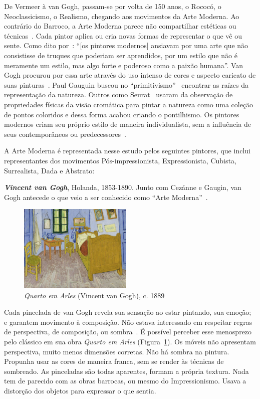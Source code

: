 De Vermeer à van Gogh, passam-se por volta de 150 anos, o Rococó, o
Neoclassicismo, o Realismo, chegando aos movimentos da Arte
Moderna. Ao contrário do Barroco, a Arte Moderna parece não
compartilhar estéticas ou técnicas~\cite{dempsey}. Cada pintor aplica
ou cria novas formas de representar o que vê ou sente. Como dito
por~\citeauthor{gombrich}: ``[os pintores modernos] ansiavam por uma
arte que não consistisse de truques que poderiam ser aprendidos, por
um estilo que não é meramente um estilo, mas algo forte e poderoso
como a paixão humana''. Van Gogh procurou por essa arte através do uso
intenso de cores e aspecto caricato de suas pinturas~\cite{hulsker}.
Paul Gauguin buscou no ``primitivismo''~\cite{lovejoy} encontrar as
raízes da representação da natureza. Outros como Seurat~\cite{kemp}
usaram da observação de propriedades físicas da visão cromática para
pintar a natureza como uma coleção de pontos coloridos e dessa forma
acabou criando o pontilhismo. Os pintores modernos criam seu próprio
estilo de maneira individualista, sem a influência de seus
contemporâneos ou predecessores~\cite{gombrich}.

A Arte Moderna é representada nesse estudo pelos seguintes pintores, que inclui representantes dos movimentos Pós-impressionista, Expressionista, Cubista, Surrealista, Dada e Abstrato:

\textbf{\emph{Vincent van Gogh}}, Holanda, 1853-1890. Junto com
Cezánne e Gaugin, van Gogh antecede o que veio a ser conhecido como
``Arte Moderna''~\cite{gombrich}. 

\begin{figure}
  \begin{center}
    \includegraphics[width=0.48\textwidth]{figs/vangogh_quarto.png}
  \end{center}
  \caption{\emph{Quarto em Arles} (Vincent van Gogh), c. 1889}
  \label{fig:vangogh:quarto}
\end{figure}

Cada pincelada de van Gogh revela
sua sensação ao estar pintando, sua emoção; e garantem movimento à
composição. Não estava interessado em respeitar regras de perspectiva,
de composição, ou sombra~\cite{hulsker}. É possível perceber esse
menosprezo pelo clássico em sua obra \textit{Quarto em Arles}
(Figura~\ref{fig:vangogh:quarto}). Os móveis não apresentam
perspectiva, muito menos dimensões corretas. Não há sombra na
pintura. Propunha usar as cores de maneira franca, sem se render às
técnicas de sombreado. As pinceladas são todas aparentes, formam a
própria textura. Nada tem de parecido com as obras barrocas, ou mesmo
do Impressionismo. Usava a distorção dos objetos para expressar o que
sentia. 

